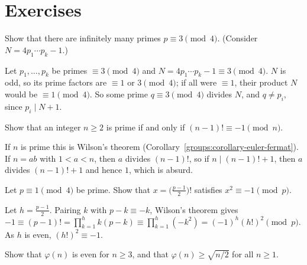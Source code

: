 \section{Exercises}\label{number-theory:section-exercises}

\begin{exercise}\label{number-theory:exercise-three-mod-four}
Show that there are infinitely many primes $p \equiv 3 \pmod 4$. (Consider $N = 4p_1 \cdots p_k - 1$.)
\end{exercise}

\begin{solution}
Let $p_1, \ldots, p_k$ be primes $\equiv 3 \pmod 4$ and $N = 4p_1 \cdots p_k - 1 \equiv 3 \pmod 4$. $N$ is odd, so its prime factors are $\equiv 1$ or $3 \pmod 4$; if all were $\equiv 1$, their product $N$
would be $\equiv 1 \pmod 4$. So some prime $q \equiv 3 \pmod 4$ divides $N$, and $q \neq p_i$, since $p_i \mid N + 1$.
\end{solution}

\begin{exercise}\label{number-theory:exercise-wilson-converse}
Show that an integer $n \geq 2$ is prime if and only if $(n - 1)! \equiv -1 \pmod n$.
\end{exercise}

\begin{solution}
If $n$ is prime this is Wilson's theorem (Corollary~\ref{groups:corollary-euler-fermat}). If $n = ab$ with $1 < a < n$, then $a$ divides $(n - 1)!$, so if $n \mid (n - 1)! + 1$, then $a$ divides
$(n - 1)! + 1$ and hence $1$, which is absurd.
\end{solution}

\begin{exercise}\label{number-theory:exercise-wilson-square-root}
Let $p \equiv 1 \pmod 4$ be prime. Show that $x = \bigl(\frac{p-1}{2}\bigr)!$ satisfies $x^2 \equiv -1 \pmod p$.
\end{exercise}

\begin{solution}
Let $h = \frac{p-1}{2}$. Pairing $k$ with $p - k \equiv -k$, Wilson's theorem gives $-1 \equiv (p - 1)! = \prod_{k=1}^{h}k(p - k) \equiv \prod_{k=1}^{h}(-k^2) = (-1)^h(h!)^2 \pmod p$. As $h$ is even,
$(h!)^2 \equiv -1$.
\end{solution}

\begin{exercise}\label{number-theory:exercise-phi-even}
Show that $\varphi(n)$ is even for $n \geq 3$, and that $\varphi(n) \geq \sqrt{n/2}$ for all $n \geq 1$.
\end{exercise}


